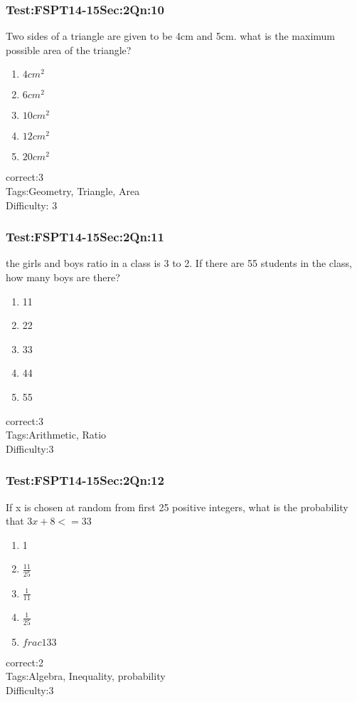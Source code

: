 \documentclass[]{beamer}
\begin{document}
    \begin{frame}
	    \frametitle{Test:FSPT14-15\hspace{2mm}Sec:2\hspace{2mm}Qn:10}
	    Two sides of a triangle are given to be 4cm and 5cm. what is the maximum possible area of the triangle?
	    \begin{enumerate}
	        \item
	            $4 cm^2$
	        \item
	            $6 cm^2$
	        \item
	            $10 cm^2$
	        \item
	            $12 cm^2 $
	        \item
	            $20 cm^2$
	    \end{enumerate}
	    correct:3  \\   
	    Tags:Geometry, Triangle, Area    \\
	    Difficulty: 3   \\
    \end{frame}
    \begin{frame}
	    \frametitle{Test:FSPT14-15\hspace{2mm}Sec:2\hspace{2mm}Qn:11}
	the girls and boys ratio in a class is 3 to 2. If there are 55 students in the class, how many boys are there?         
	    \begin{enumerate}
	        \item
	            11
	        \item
	            22
	        \item
	            33
	        \item
	            44
	        \item
	            55
	    \end{enumerate}
	    correct:3  \\   
	    Tags:Arithmetic, Ratio    \\
	    Difficulty:3   \\
    \end{frame}
    \begin{frame}
	    \frametitle{Test:FSPT14-15\hspace{2mm}Sec:2\hspace{2mm}Qn:12}
If x is chosen at random from first 25 positive integers, what is the probability that $3x+8<=33$	       
	    \begin{enumerate}
	        \item
	            1
	        \item
	            $\frac{11}{25}$
	        \item
	            $\frac{1}{11}$
	        \item
	            $\frac{1}{25}$
	        \item
	            $frac{1}{33}$
	    \end{enumerate}
	    correct:2  \\   
	    Tags:Algebra, Inequality, probability    \\
	    Difficulty:3   \\
    \end{frame}
\end{document}
